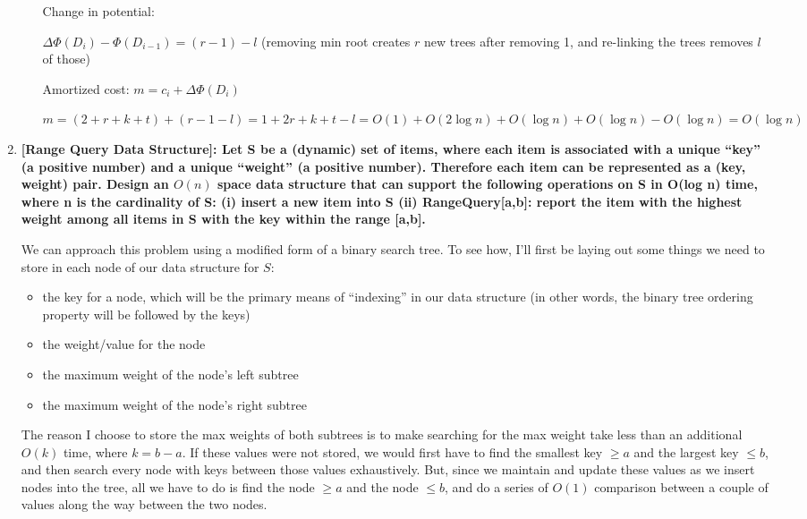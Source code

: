 \documentclass[12pt]{article}
\begin{document}
\begin{enumerate}
\begin{itemize}
        Change in potential:

        $\Delta \Phi(D_i) - \Phi(D_{i - 1}) = (r - 1) - l$ (removing min root creates $r$ new trees after removing 1, and 
        re-linking the trees removes $l$ of those)

        Amortized cost: $m = c_i + \Delta \Phi(D_i)$

        $m = (2 + r + k + t) + (r - 1 - l) = 1 + 2r + k + t - l = O(1) + O(2\log n) + O(\log n) + O(\log n) - O(\log n) = O(\log n)$

    \end{itemize}

    \item \textbf{[Range Query Data Structure]: Let S be a (dynamic) set of items, where each item is 
    associated with a unique ``key'' (a positive number) and a unique ``weight'' (a positive 
    number). Therefore each item can be represented as a (key, weight) pair. Design an $O(n)$ 
    space data structure that can support the following operations on S in O(log n) time, where 
    n is the cardinality of S: (i) insert a new item into S (ii) RangeQuery[a,b]: report the 
    item with the highest weight among all items in S with the key within the range [a,b].}

    We can approach this problem using a modified form of a binary search tree. To see how, I'll first be laying out 
    some things we need to store in each node of our data structure for $S$:

    \begin{itemize}
        \item the key for a node, which will be the primary means of ``indexing'' in our data structure (in other words, 
        the binary tree ordering property will be followed by the keys)
        \item the weight/value for the node
        \item the maximum weight of the node's left subtree
        \item the maximum weight of the node's right subtree
    \end{itemize}

    The reason I choose to store the max weights of both subtrees is to make searching for the max weight 
    take less than an additional $O(k)$ time, where $k = b - a$. If these values were not stored, we would first 
    have to find the smallest key $\geq a$ and the largest key $\leq b$, and then search every node with keys 
    between those values exhaustively. But, since we maintain and update these values as we insert nodes into the 
    tree, all we have to do is find the node $\geq a$ and the node $\leq b$, and do a series of $O(1)$ comparison between 
    a couple of values along the way between the two nodes.


\end{enumerate}
\end{document}

